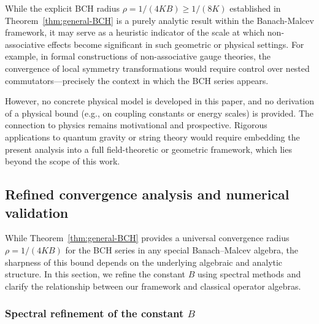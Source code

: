 \documentclass[11pt]{amsart}
\numberwithin{equation}{section}
\theoremstyle{remark}
\begin{document}
While the explicit BCH radius $\rho = 1/(4KB) \geq 1/(8K)$ established in Theorem~\ref{thm:general-BCH} is a purely analytic result within the Banach-Malcev framework, it may serve as a heuristic indicator of the scale at which non-associative effects become significant in such geometric or physical settings. For example, in formal constructions of non-associative gauge theories, the convergence of local symmetry transformations would require control over nested commutators—precisely the context in which the BCH series appears.

However, no concrete physical model is developed in this paper, and no derivation of a physical bound (e.g., on coupling constants or energy scales) is provided. The connection to physics remains motivational and prospective. Rigorous applications to quantum gravity or string theory would require embedding the present analysis into a full field-theoretic or geometric framework, which lies beyond the scope of this work.

\subsection{Refined convergence analysis and numerical validation}
\label{sec:refined}

While Theorem~\ref{thm:general-BCH} provides a universal convergence radius $\rho = 1/(4KB)$ for the BCH series in any special Banach--Malcev algebra, the sharpness of this bound depends on the underlying algebraic and analytic structure. In this section, we refine the constant $B$ using spectral methods and clarify the relationship between our framework and classical operator algebras.

\subsubsection{Spectral refinement of the constant $B$}
\end{document}
